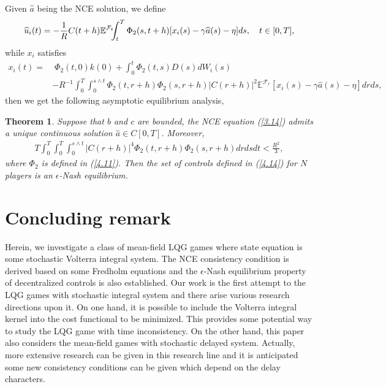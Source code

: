 \documentclass[11pt]{article}
\def\3n{\negthinspace \negthinspace \negthinspace }
\newtheorem{theorem}{Theorem}[section]
\def\dbE{\mathbb{E}}
\begin{document}
Given $\widehat{a}$ being the NCE solution, we define %
%
\begin{eqnarray}\label{4.14}
\widehat{u}_{i}(t)=-\frac{1}{R}C(t+h)\dbE^{\mathcal{F}_{t}}\3n\int_{t}^{T}\Phi_2
(s,t+h)[x_{i}(s)-\gamma \widehat{a}(s)-\eta]ds,\quad t\in[0,T],
\end{eqnarray}
%
while $x_{i}$ satisfies
%
\begin{align*}
x_{i}(t) = & \; \Phi_2(t,0)k(0)+\int_{0}^{t}\Phi_2(t,s)D(s)dW_{i}(s) \\
& -R^{-1}\int_{0}^{T}\int_{0}^{s\wedge t}\Phi_2(t,r+h)\Phi_2(s,r+h)|C(r+h)|^{2}\dbE^{\mathcal{F}_{r}}[x_{i}(s)-\gamma\widehat{a}(s)-\eta]drds,
\end{align*}
%
then we get the following asymptotic equilibrium analysis,
\begin{theorem}\label{theorem4-6}
Suppose that $b$ and $c$ are bounded, the NCE equation (\ref{3.14})
admits a unique continuous solution $\widehat{a}\in C[0,T]$.
Moreover,
%
\begin{eqnarray*}
T\int_{0}^{T}\int_{0}^{T}\int_{0}^{s\wedge
t}|C(r+h)|^4\Phi_2(t,r+h)\Phi_2(s,r+h)drdsdt<\frac{R^{2}}{3},
\end{eqnarray*}
%
where $\Phi_2$ is defined in (\ref{4.11}). Then the set of controls
defined in (\ref{4.14}) for $N$ players is an $\epsilon$-Nash
equilibrium.
\end{theorem}



\section{Concluding remark} Herein, we investigate a class of mean-field LQG games
where state equation is some stochastic Volterra integral system.
The NCE consistency condition is derived based on some Fredholm
equations and the $\epsilon$-Nash equilibrium property of
decentralized controls is also established. Our work is the first
attempt to the LQG games with stochastic integral system and there
arise various research directions upon it. On one hand, it is
possible to include the Volterra integral kernel into the cost
functional to be minimized. This provides some potential way to
study the LQG game with time inconsistency. On the other hand, this
paper also considers the mean-field games with stochastic delayed
system. Actually, more extensive research can be given in this
research line and it is anticipated some new consistency conditions
can be given which depend on the delay characters.
\end{document}
